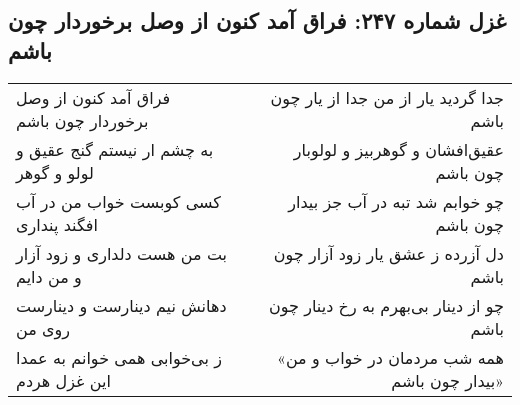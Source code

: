 \begin{center}
\section*{غزل شماره ۲۴۷: فراق آمد کنون از وصل برخوردار چون باشم}
\label{sec:247}
\begin{longtable}{l p{0.5cm} r}
فراق آمد کنون از وصل برخوردار چون باشم
&&
جدا گردید یار از من جدا از یار چون باشم
\\
به چشم ار نیستم گنج عقیق و لولو و گوهر
&&
عقیق‌افشان و گوهربیز و لولوبار چون باشم
\\
کسی کوبست خواب من در آب افگند پنداری
&&
چو خوابم شد تبه در آب جز بیدار چون باشم
\\
بت من هست دلداری و زود آزار و من دایم
&&
دل آزرده ز عشق یار زود آزار چون باشم
\\
دهانش نیم دینارست و دینارست روی من
&&
چو از دینار بی‌بهرم به رخ دینار چون باشم
\\
ز بی‌خوابی همی خوانم به عمدا این غزل هردم
&&
«همه شب مردمان در خواب و من بیدار چون باشم»
\\
\end{longtable}
\end{center}
